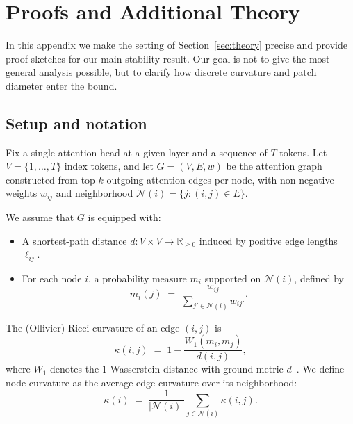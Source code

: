 \documentclass{article}
\theoremstyle{plain}
\theoremstyle{definition}
\theoremstyle{remark}
\newcommand{\RR}{\mathbb{R}}
\newcommand{\cN}{\mathcal{N}}
\begin{document}



\newpage
\appendix
\onecolumn

\section{Proofs and Additional Theory}
\label{app:proofs}

In this appendix we make the setting of Section~\ref{sec:theory} precise and provide proof sketches for our main stability result. Our goal is not to give the most general analysis possible, but to clarify how discrete curvature and patch diameter enter the bound.

\subsection{Setup and notation}

Fix a single attention head at a given layer and a sequence of $T$ tokens. Let $V = \{1,\dots,T\}$ index tokens, and let $G=(V,E,w)$ be the attention graph constructed from top-$k$ outgoing attention edges per node, with non-negative weights $w_{ij}$ and neighborhood $\cN(i) = \{j : (i,j)\in E\}$.

We assume that $G$ is equipped with:
\begin{itemize}
  \item A shortest-path distance $d: V\times V \to \RR_{\ge 0}$ induced by positive edge lengths $\ell_{ij}$.
  \item For each node $i$, a probability measure $m_i$ supported on $\cN(i)$, defined by
  \begin{equation}
    m_i(j) \;=\; \frac{w_{ij}}{\sum_{j'\in\cN(i)} w_{ij'}}.
  \end{equation}
\end{itemize}

The (Ollivier) Ricci curvature of an edge $(i,j)$ is
\begin{equation}
  \kappa(i,j) \;=\; 1 - \frac{W_1(m_i, m_j)}{d(i,j)},
\end{equation}
where $W_1$ denotes the $1$-Wasserstein distance with ground metric $d$~\citep{ollivier2009ricci,villani2009optimal}. We define node curvature as the average edge curvature over its neighborhood:
\begin{equation}
  \kappa(i) \;=\; \frac{1}{|\cN(i)|}\sum_{j\in\cN(i)} \kappa(i,j).
\end{equation}
\end{document}

